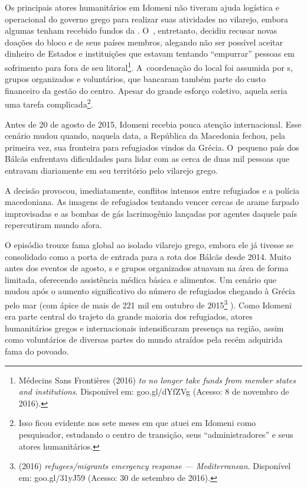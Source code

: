 Os principais atores humanitários em Idomeni não tiveram ajuda logística
e operacional do governo grego para realizar suas atividades no
vilarejo, embora algumas tenham recebido fundos da . O~,
entretanto, decidiu recusar novas doações do bloco e de seus países
membros, alegando não ser possível aceitar dinheiro de Estados e
instituições que estavam tentando ``empurrar'' pessoas em sofrimento
para fora de seu litoral\footnote{ Médecins Sans Frontières (2016) \emph{ to no
longer take funds from  member states and institutions}. Disponível
em:
goo.gl/dYfZVg
(Acesso: 8 de novembro de 2016).}. A~coordenação do local foi
assumida por s, grupos organizados e voluntários, que bancaram também
parte do custo financeiro da gestão do centro. Apesar do grande esforço
coletivo, aquela seria uma tarefa complicada\footnote{ Isso ficou evidente nos sete meses em que atuei em
Idomeni como pesquisador, estudando o centro de transição, seus
``administradores'' e seus atores humanitários.}.

Antes de 20 de agosto de 2015, Idomeni recebia pouca atenção
internacional. Esse cenário mudou quando, naquela data, a República da
Macedonia fechou, pela primeira vez, sua fronteira para refugiados vindos da Grécia.
O~pequeno país dos Bálcãs enfrentava dificuldades para
lidar com as cerca de duas mil pessoas que entravam diariamente em seu
território pelo vilarejo grego.

A decisão provocou, imediatamente, conflitos intensos entre
refugiados e a polícia macedoniana. As imagens de refugiados tentando
vencer cercas de arame farpado improvisadas e as bombas de gás
lacrimogênio lançadas por agentes daquele país repercutiram mundo afora.

O episódio trouxe fama global ao isolado vilarejo grego, embora ele já
tivesse se consolidado como a porta de entrada para a rota dos Bálcãs
desde 2014. Muito antes dos eventos de agosto, s e grupos organizados
atuavam na área de forma limitada, oferecendo assistência médica básica
e alimentos. Um cenário que mudou após o aumento significativo do número
de refugiados chegando à Grécia pelo mar (com ápice de mais de 221 mil
em outubro de 2015\footnote{  (2016) \emph{ refugees/migrants emergency
response --- Mediterranean}. Disponível em:
goo.gl/31yJ59
(Acesso: 30 de setembro
de 2016).} ). Como Idomeni era parte central do
trajeto da grande maioria dos refugiados, atores humanitários gregos e
internacionais intensificaram presença na região, assim como voluntários
de diversas partes do mundo atraídos pela recém adquirida fama do
povoado.

